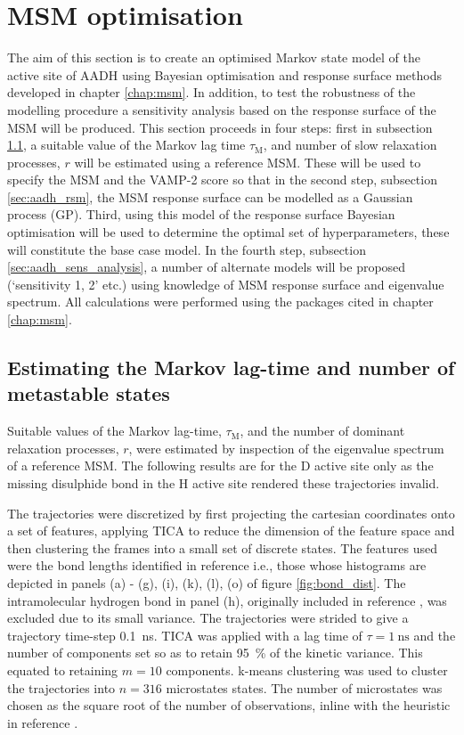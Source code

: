 \section{MSM optimisation}\label{sec:aadh_optimisation}

The aim of this section is to create an optimised Markov state model of the active site of AADH using Bayesian optimisation and response surface methods developed in chapter \ref{chap:msm}. In addition, to test the robustness of the modelling procedure a sensitivity analysis based on the response surface of the MSM will be produced. This section proceeds in four steps: first in subsection \ref{sec:aadh_est_tau_k}, a suitable  value of the Markov lag time $\tau_{\mathrm{M}}$, and number of slow relaxation processes, $r$ will be estimated using a reference MSM. These will be used to specify the MSM and the VAMP-2 score so that in the second step, subsection \ref{sec:aadh_rsm},  the MSM response surface can be modelled as a Gaussian process (GP). Third, using this model of the response surface Bayesian optimisation will be used to determine the optimal set of hyperparameters, these will constitute the base case model.  In the fourth step, subsection \ref{sec:aadh_sens_analysis}, a number of alternate models will be proposed (`sensitivity 1, 2' etc.)  using knowledge of MSM response surface and eigenvalue spectrum.  All calculations were performed using the packages cited in chapter \ref{chap:msm}. 

\subsection{Estimating the Markov lag-time and number of metastable states}\label{sec:aadh_est_tau_k}

Suitable values of the Markov lag-time, $\tau_{\mathrm{M}}$, and  the number of dominant relaxation processes, $r$, were estimated by inspection of the eigenvalue spectrum of a reference MSM. The following results are for the D active site only as the missing disulphide bond in the H active site rendered these trajectories invalid.

The trajectories were discretized by first projecting the cartesian coordinates onto a set of features, applying TICA to reduce the dimension of the feature space and then clustering the frames into a small set of discrete states.  The features used were the bond lengths identified in reference \cite{ranaghanInitioQMMM2017} i.e., those whose histograms are depicted in panels (a) - (g), (i), (k), (l), (o) of figure \ref{fig:bond_dist}. The intramolecular hydrogen bond in panel (h), originally included in reference \cite{ranaghanInitioQMMM2017}, was excluded due to its small variance. The trajectories were strided to give a trajectory time-step \SI{0.1}{\nano\second}. TICA was applied with a lag time of $\tau=\SI{1}{\nano\second}$ and the number of components set so as to retain \SI{95}{\percent} of the kinetic variance. This equated to retaining $m=10$ components. k-means clustering was used to cluster the trajectories into $n = 316$ microstates states. The number of microstates was chosen as the square root of the number of observations, inline with the heuristic in reference  \cite{husicWardClusteringImproves2017a}. 

